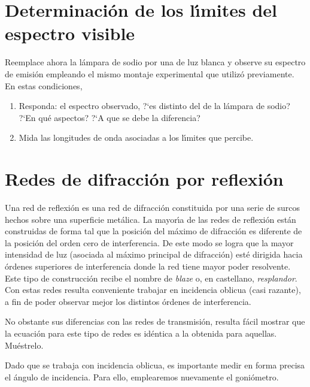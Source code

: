 \documentclass[laboratorio]{guia}
\begin{document}
\section{Determinaci\'on de los l\'\i mites del espectro visible}

Reemplace ahora la l\'ampara de sodio por una de luz blanca y observe su  
espectro de emisi\'on empleando el mismo montaje experimental que utiliz\'o 
previamente. En estas condiciones, 

\begin{enumerate}
    \item Responda: el espectro observado, ?`es distinto del de la l\'ampara 
        de sodio? ?`En qu\'e aspectos? ?`A que se debe la diferencia? 
    \item Mida las longitudes de onda asociadas a los l\'\i mites que percibe.
\end{enumerate}


\section{Redes de difracci\'on por reflexi\'on}

Una red de reflexi\'on es una red de difracci\'on constituida por una serie
de surcos hechos sobre una superficie met\'alica. La mayor\'\i a de las redes
de reflexi\'on est\'an construidas de forma tal que la posici\'on del m\'aximo
de difracci\'on es diferente de la posici\'on del orden cero de interferencia.
De este modo se logra que la mayor intensidad de luz (asociada al 
m\'aximo principal de difracci\'on) est\'e dirigida hacia \'ordenes superiores
de interferencia donde la red tiene mayor poder resolvente. Este tipo de 
construcci\'on recibe el nombre de {\it blaze} o, en castellano, {\it
resplandor}. Con estas redes resulta conveniente trabajar en incidencia oblicua
(casi razante), a fin de poder observar mejor los distintos \'ordenes de
interferencia. 

No obstante sus diferencias con las redes de transmisi\'on, resulta f\'acil
mostrar que la ecuaci\'on para este tipo de redes es id\'entica a la obtenida
para aquellas. Mu\'estrelo. 

Dado que se trabaja con incidencia oblicua, es importante medir en forma 
precisa el \'angulo de incidencia. Para ello, emplearemos nuevamente el 
goni\'ometro. 
\end{document}
